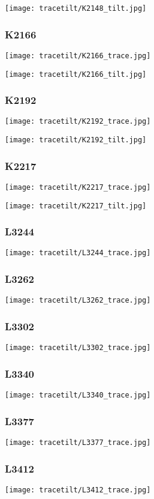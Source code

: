 \texttt{[image: tracetilt/K2148\_tilt.jpg]}

\subsubsection{K2166}
\texttt{[image: tracetilt/K2166\_trace.jpg]}

\texttt{[image: tracetilt/K2166\_tilt.jpg]}

\subsubsection{K2192}
\texttt{[image: tracetilt/K2192\_trace.jpg]}

\texttt{[image: tracetilt/K2192\_tilt.jpg]}

\subsubsection{K2217}
\texttt{[image: tracetilt/K2217\_trace.jpg]}

\texttt{[image: tracetilt/K2217\_tilt.jpg]}

\subsubsection{L3244}
\texttt{[image: tracetilt/L3244\_trace.jpg]}
\subsubsection{L3262}
\texttt{[image: tracetilt/L3262\_trace.jpg]}
\subsubsection{L3302}
\texttt{[image: tracetilt/L3302\_trace.jpg]}
\subsubsection{L3340}
\texttt{[image: tracetilt/L3340\_trace.jpg]}
\subsubsection{L3377}
\texttt{[image: tracetilt/L3377\_trace.jpg]}
\subsubsection{L3412}
\texttt{[image: tracetilt/L3412\_trace.jpg]}
